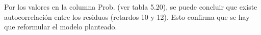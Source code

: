 \begin{enumerate}
Por los valores en la columna Prob. (ver tabla 5.20), se puede concluir que existe autocorrelaci\'{o}n entre los residuos (retardos 10 y 12). Esto confirma que se hay que reformular el modelo planteado.
%
%
%
%

\end{enumerate}
